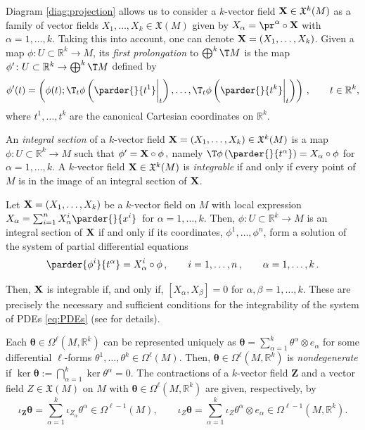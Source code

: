 \documentclass[11pt,a4paper]{article}
\newcommand{\R}{\mathbb{R}}
\theoremstyle{plain} \newtheorem{theorem}{Theorem}[section] \newtheorem{proposition}[theorem]{Proposition} \newtheorem{corollary}[theorem]{Corollary} \newtheorem{lemma}[theorem]{Lemma} \theoremstyle{definition} \newtheorem{definition}[theorem]{Definition} \theoremstyle{remark} \newtheorem{remark}[theorem]{Remark} \newtheorem{example}[theorem]{Example} %
\begin{document}
Diagram \eqref{diag:projection} allows us to consider a $k$-vector field ${\bf X}\in\mathfrak{X}^k(M)$ as a family of vector fields $X_1,\dotsc,X_k\in\mathfrak{X}(M)$ given by $X_\alpha = \pr^\alpha\circ{\bf X}$ with $\alpha=1,\ldots,k$. Taking this into account, one can denote ${\bf X} = (X_1,\dotsc, X_k)$. 
 \label{dfn:first-prolongation-k-tangent-bundle}
    Given a map $\phi\colon U\subset\R^k\to M$, its {\it first prolongation} to $\bigoplus^k\T M$ is the map $\phi'\colon U\subset\R^k\to\bigoplus^k\T M$ 
    defined by
    $$ \phi'(t) = \left( \phi(t); \T_t\phi\left( \parder{}{t^1}\bigg\vert_t \right),\dotsc,\T_t\phi\left( \parder{}{t^k}\bigg\vert_t \right) \right)\,, \qquad t\in\mathbb{R}^k, $$
    where $t^1,\dotsc,t^k$ are the canonical Cartesian coordinates on $\R^k$.
 

    An {\it integral section} of a $k$-vector field ${\bf X} = (X_1,\dotsc,X_k)\in\mathfrak{X}^k(M)$ is a map $\phi\colon U\subset\R^k\to M$ such that
    $ \phi' = {\bf X}\circ\phi\,, $
    namely $\T\phi \left(\parder{}{t^\alpha}\right) = X_\alpha\circ\phi$ for $\alpha=1,\ldots,k$. A $k$-vector field ${\bf X}\in\mathfrak{X}^k(M)$ is {\it integrable} if and only if every point of $M$ is in the image of an integral section of ${\bf X}$.
 

  Let ${\bf X} = (X_1,\ldots, X_k)$ be a $k$-vector field  on $M$ with local expression $ X_\alpha = \sum_{i=1}^nX_\alpha^i\parder{}{x^i}\,$ for $\alpha=1,\ldots,k$. 
Then, $\phi\colon U\subset\R^k\to M$ is an integral section of ${\bf X}$ if and only if its coordinates, $\phi^1,\ldots,\phi^n$, form a solution of the system of partial differential equations
\begin{equation}
\label{eq:PDEs}
\parder{\phi^i}{t^\alpha} = X_\alpha^i\circ\phi\,,\qquad i=1,\ldots,n\,,\qquad \alpha=1,\ldots,k\,.
\end{equation}

Then, ${\bf X}$ is integrable if, and only if, $[X_\alpha,X_\beta] = 0$ for $\alpha,\beta=1,\ldots,k$. These are precisely the necessary and sufficient conditions for the integrability of the system of PDEs \eqref{eq:PDEs} (see \cite{OLV_86} for details). 


Each $\bm\theta\in \Omega^\ell(M,\R^k)$ can be represented uniquely as $\bm\theta=\sum_{\alpha=1}^k\theta^\alpha\otimes e_\alpha$ for some differential $\ell$-forms $\theta^1,\ldots,\theta^k \in \Omega^\ell(M)$. 
Then, $\bm\theta\in \Omega^\ell(M,\R^k)$ is {\it nondegenerate} if $\ker\bm\theta:=\bigcap^k_{\alpha=1}\ker\theta^\alpha=0$.
The contractions of a $k$-vector field ${\bm Z}$ and a vector field $Z\in \mathfrak{X}(M)$ on $M$ with $\bm \theta\in \Omega^\ell(M,\mathbb{R}^k)$ are given, respectively, by
$$
\iota_{\bm Z}\bm \theta=\sum_{\alpha=1}^k\iota_{Z_\alpha}\theta^\alpha \in \Omega^{\ell-1}(M),\qquad
\iota_{Z}\bm \theta=\sum_{\alpha=1}^k\iota_{Z}\theta^\alpha\otimes e_\alpha\in \Omega^{\ell-1}(M,\mathbb{R}^k).
$$
\end{document}
